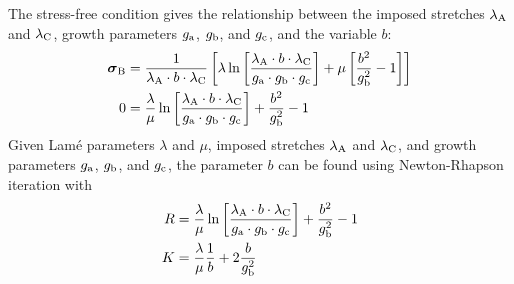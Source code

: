 \documentclass[10pt,letterpaper,oneside]{report}
\newcommand{\ten}[1]{\mbox{\boldmath $#1$}{}}
\newcommand{\scas}[1]{\mbox{{\scriptsize{${\rm{#1}}$}}}{}}
\begin{document}
The stress-free condition gives the relationship between the imposed stretches $\lambda_{\scas{A}}$ and $\lambda_{\scas{C}}$, growth parameters $g_{\scas{a}}$, $g_{\scas{b}}$, and $g_{\scas{c}}$, and the variable $b$:
\begin{align}
\ten{\sigma}_{\scas{B}} &= \frac{1}{\lambda_{\scas{A}} \cdot b \cdot \lambda_{\scas{C}}} \left[ \lambda \ln \left[ \frac{\lambda_{\scas{A}} \cdot b \cdot \lambda_{\scas{C}} }{g_{\scas{a}} \cdot g_{\scas{b}} \cdot g_{\scas{c}}} \right] + \mu \left[ \frac{b^2}{g_{\scas{b}}^2} - 1 \right] \right] \\
0 &= \frac{\lambda}{\mu} \ln \left[ \frac{\lambda_{\scas{A}} \cdot b \cdot \lambda_{\scas{C}} }{g_{\scas{a}} \cdot g_{\scas{b}} \cdot g_{\scas{c}}} \right] + \frac{b^2}{g_{\scas{b}}^2} - 1 
\end{align}
Given Lamé parameters $\lambda$ and $\mu$, imposed stretches $\lambda_{\scas{A}}$ and $\lambda_{\scas{C}}$, and growth parameters $g_{\scas{a}}$, $g_{\scas{b}}$, and $g_{\scas{c}}$, the parameter $b$ can be found using Newton-Rhapson iteration with 
\begin{align}
R &= \frac{\lambda}{\mu} \ln \left[ \frac{\lambda_{\scas{A}} \cdot b \cdot \lambda_{\scas{C}} }{g_{\scas{a}} \cdot g_{\scas{b}} \cdot g_{\scas{c}}} \right] + \frac{b^2}{g_{\scas{b}}^2} - 1 \\
K &= \frac{\lambda}{\mu} \frac{1}{b} + 2 \frac{b}{g_{\scas{b}}^2}
\end{align}
\end{document}
